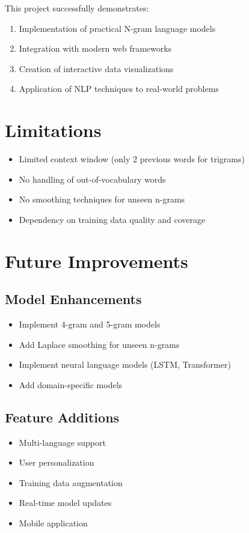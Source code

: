 \documentclass[12pt,a4paper]{report}
\begin{document}
This project successfully demonstrates:
\begin{enumerate}
    \item Implementation of practical N-gram language models
    \item Integration with modern web frameworks
    \item Creation of interactive data visualizations
    \item Application of NLP techniques to real-world problems
\end{enumerate}

\section{Limitations}

\begin{itemize}
    \item Limited context window (only 2 previous words for trigrams)
    \item No handling of out-of-vocabulary words
    \item No smoothing techniques for unseen n-grams
    \item Dependency on training data quality and coverage
\end{itemize}

\section{Future Improvements}

\subsection{Model Enhancements}
\begin{itemize}
    \item Implement 4-gram and 5-gram models
    \item Add Laplace smoothing for unseen n-grams
    \item Implement neural language models (LSTM, Transformer)
    \item Add domain-specific models
\end{itemize}

\subsection{Feature Additions}
\begin{itemize}
    \item Multi-language support
    \item User personalization
    \item Training data augmentation
    \item Real-time model updates
    \item Mobile application
\end{itemize}
\end{document}
